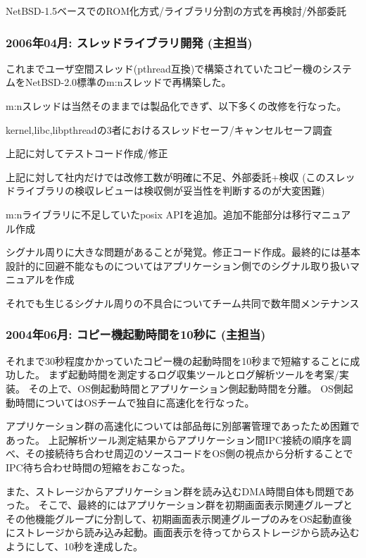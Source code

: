 \documentclass[letterpaper]{article}
\renewenvironment{itemize}{
  \begin{list}{}{
    \setlength{\leftmargin}{1.5em}
  }
}{
  \end{list}
}
\begin{document}
\begin{itemize}
  \item NetBSD-1.5ベースでのROM化方式/ライブラリ分割の方式を再検討/外部委託
\end{itemize}

\subsubsection*{2006年04月: スレッドライブラリ開発 (主担当)}
これまでユーザ空間スレッド(pthread互換)で構築されていたコピー機のシステムをNetBSD-2.0標準のm:nスレッドで再構築した。

m:nスレッドは当然そのままでは製品化できず、以下多くの改修を行なった。
\begin{itemize}
  \item kernel,libc,libpthreadの3者におけるスレッドセーフ/キャンセルセーフ調査
  \item 上記に対してテストコード作成/修正
  \item 上記に対して社内だけでは改修工数が明確に不足、外部委託+検収 (このスレッドライブラリの検収レビューは検収側が妥当性を判断するのが大変困難)
  \item m:nライブラリに不足していたposix APIを追加。追加不能部分は移行マニュアル作成
  \item シグナル周りに大きな問題があることが発覚。修正コード作成。最終的には基本設計的に回避不能なものについてはアプリケーション側でのシグナル取り扱いマニュアルを作成
  \item それでも生じるシグナル周りの不具合についてチーム共同で数年間メンテナンス
\end{itemize}

\subsubsection*{2004年06月: コピー機起動時間を10秒に (主担当)}
それまで30秒程度かかっていたコピー機の起動時間を10秒まで短縮することに成功した。
まず起動時間を測定するログ収集ツールとログ解析ツールを考案/実装。
その上で、OS側起動時間とアプリケーション側起動時間を分離。
OS側起動時間についてはOSチームで独自に高速化を行なった。

アプリケーション群の高速化については部品毎に別部署管理であったため困難であった。
上記解析ツール測定結果からアプリケーション間IPC接続の順序を調べ、その接続待ち合わせ周辺のソースコードをOS側の視点から分析することでIPC待ち合わせ時間の短縮をおこなった。

また、ストレージからアプリケーション群を読み込むDMA時間自体も問題であった。
そこで、最終的にはアプリケーション群を初期画面表示関連グループとその他機能グループに分割して、初期画面表示関連グループのみをOS起動直後にストレージから読み込み起動。画面表示を待ってからストレージから読み込むようにして、10秒を達成した。
\end{document}
